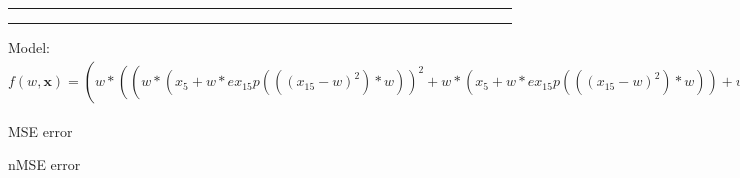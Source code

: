 \documentclass[12pt]{article}
\begin{document}
\hrule
\vspace{1cm}
\hrule
\vspace{1cm}
Model: $f(w,\mathbf{x})=(w*((w*(x_5+w*ex_15p(((x_15-w)^2)*w))^2+w*(x_5+w*ex_15p(((x_15-w)^2)*w))+w)*(w*(x_4)^2+w*(x_4)+w))^2+w*((w*(x_5+w*ex_15p(((x_15-w)^2)*w))^2+w*(x_5+w*ex_15p(((x_15-w)^2)*w))+w)*(w*(x_4)^2+w*(x_4)+w))+w)*((w*((w*(x_5+x_2)^2+w*(x_5+x_2)+w)*((w*(x_5+(x_3)*((w*(x_10+w*(x_4)^2+w*(x_4)+w)^2+w*(x_10+w*(x_4)^2+w*(x_4)+w)+w)*(w*(x_4)^2+w*(x_4)+w))+x_8)^2+w*(x_5+(x_3)*((w*(x_10+w*(x_4)^2+w*(x_4)+w)^2+w*(x_10+w*(x_4)^2+w*(x_4)+w)+w)*(w*(x_4)^2+w*(x_4)+w))+x_8)+w)*(w*(x_4)^2+w*(x_4)+w)))^2+w*((w*(x_5+x_2)^2+w*(x_5+x_2)+w)*((w*(x_5+(x_3)*((w*(x_10+w*(x_4)^2+w*(x_4)+w)^2+w*(x_10+w*(x_4)^2+w*(x_4)+w)+w)*(w*(x_4)^2+w*(x_4)+w))+x_8)^2+w*(x_5+(x_3)*((w*(x_10+w*(x_4)^2+w*(x_4)+w)^2+w*(x_10+w*(x_4)^2+w*(x_4)+w)+w)*(w*(x_4)^2+w*(x_4)+w))+x_8)+w)*(w*(x_4)^2+w*(x_4)+w)))+w)*(w*(x_4)^2+w*(x_4)+w))$

MSE error

nMSE error
\end{document}

